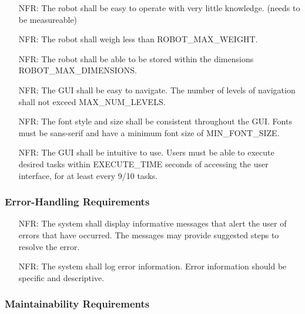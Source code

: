 \documentclass[12pt]{article}
\newcounter{nfrnum} %
\begin{document}
\noindent \begin{itemize}
\item[NFR\refstepcounter{nfrnum}\thenfrnum \label{NFR_Usability1}:] The robot shall be easy to operate with very little knowledge. (needs to be measureable)
\item[NFR\refstepcounter{nfrnum}\thenfrnum \label{NFR_Usability2}:] The robot shall weigh less than ROBOT\_MAX\_WEIGHT.
\item[NFR\refstepcounter{nfrnum}\thenfrnum \label{NFR_Usability3}:] The robot shall be able to be stored within the dimensions ROBOT\_MAX\_DIMENSIONS.
\item[NFR\refstepcounter{nfrnum}\thenfrnum \label{NFR_Usability4}:] The GUI shall be easy to navigate. The number of levels of navigation shall not exceed MAX\_NUM\_LEVELS.
\item[NFR\refstepcounter{nfrnum}\thenfrnum \label{NFR_Usability5}:] The font style and size shall be consistent throughout the GUI. Fonts must be sans-serif and have a minimum font size of MIN\_FONT\_SIZE.
\item[NFR\refstepcounter{nfrnum}\thenfrnum \label{NFR_Usability6}:] The GUI shall be intuitive to use. Users must be able to execute desired tasks within EXECUTE\_TIME seconds of accessing the user interface, for at least every 9/10 tasks.
\end{itemize}

\subsubsection{Error-Handling Requirements}
\noindent \begin{itemize}
\item[NFR\refstepcounter{nfrnum}\thenfrnum \label{NFR_Errors1}:] The system shall display informative messages that alert the user of errors that have occurred. The messages may provide suggested steps to resolve the error.
\item[NFR\refstepcounter{nfrnum}\thenfrnum \label{NFR_Errors1}:] The system shall log error information. Error information should be specific and descriptive.
\end{itemize}

\subsubsection{Maintainability Requirements}
\end{document}
